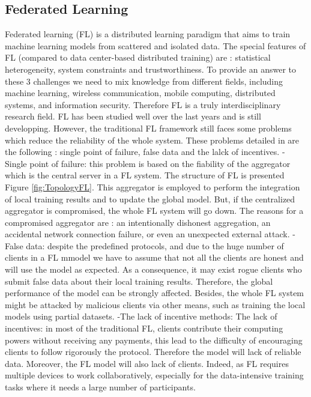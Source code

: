 \documentclass{article}
\begin{document}
\subsection{Federated Learning}
Federated learning (FL) is a distributed learning paradigm that aims to train machine learning models from scattered and isolated data. The special features of FL (compared to data center-based distributed training) are : statistical heterogeneity, system constraints and trustworthiness. To provide an answer to these 3 challenges we need to mix knowledge from different fields, including machine learning, wireless communication, mobile computing, distributed systems, and information security. Therefore FL is a truly interdisciplinary research field.  FL has been studied well over the last years and is still developping. However, the traditional FL framework still faces some problems which reduce the reliability of the whole system. These problems detailed in \cite{wang_blockchain-based_2021} are the following : single point of failure, false data and the lalck of incentives. \newline \newline - Single point of failure: this problem is based on the fiability of the aggregator which is the central server in a FL system. The structure of FL is presented Figure \ref{fig:TopologyFL}. This aggregator is employed to perform the integration of local training results and to update the global model.  But, if the centralized aggregator is compromised, the whole FL system will go down. The reasons for a compromised aggregator are : an intentionally dishonest aggregation, an accidental network connection failure, or even an unexpected external attack. \newline \newline -False data: despite the predefined protocols, and due to the huge number of clients in a FL mmodel we have to assume that not all the clients are honest and will use the model as expected. As a consequence, it may exist rogue clients who submit false data about their local training results. Therefore, the global performance of the model can be strongly affected. Besides, the whole FL system might be attacked by malicious clients via other means, such as training the local models using partial datasets. \newline \newline -The lack of incentive methods:  The lack of incentives: in most of the traditional FL, clients contribute their computing powers without receiving any payments, this lead to the difficulty of encouraging clients to follow rigorously the protocol. Therefore the model will lack of reliable data. Moreover, the FL model will also lack of clients. Indeed, as FL requires multiple devices to work collaboratively, especially for the data-intensive training tasks where it needs a large number of participants.
\end{document}
